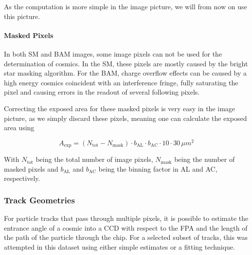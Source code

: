 \documentclass[a4paper, 11pt]{article}
\begin{document}
As the computation is more simple in the image picture, we will from now on use this picture.

\paragraph{Masked Pixels\\}

In both SM and BAM images, some image pixels can not be used for the determination of cosmics. In the SM, these pixels are mostly caused by the bright star masking algorithm. For the BAM, charge overflow effects can be caused by a high energy cosmics coincident with an interference fringe, fully saturating the pixel and causing errors in the readout of several following pixels.

Correcting the exposed area for these masked pixels is very easy in the image picture, as we simply discard these pixels, meaning one can calculate the exposed area using

\begin{equation}
  A_\mathrm{exp} = (N_\mathrm{tot} - N_\mathrm{mask}) \cdot b_\mathrm{AL} \cdot b_\mathrm{AC} \cdot 10 \cdot 30 \, \mu m^{2}
\end{equation}

With $N_\mathrm{tot}$ being the total number of image pixels, $N_\mathrm{mask}$ being the number of masked pixels and $b_\mathrm{AL}$ and $b_\mathrm{AC}$ being the binning factor in AL and AC, respectively.


\subsubsection{Track Geometries}
For particle tracks that pass through multiple pixels, it is possible to estimate the entrance angle of a cosmic into a CCD with respect to the FPA and the length of the path of the particle through the chip. For a selected subset of tracks, this was attempted in this dataset using either simple estimates or a fitting technique.
\end{document}
